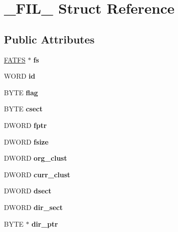 \hypertarget{struct__FIL__}{\section{\-\_\-\-F\-I\-L\-\_\- Struct Reference}
\label{struct__FIL__}
}
\subsection*{Public Attributes}
\begin{DoxyCompactItemize}
\item 
\hypertarget{struct__FIL___a2c7c5648397fc289b9cdacb36b156f9f}{\hyperlink{struct__FATFS__}{F\-A\-T\-F\-S} $\ast$ {\bfseries fs}}\label{struct__FIL___a2c7c5648397fc289b9cdacb36b156f9f}

\item 
\hypertarget{struct__FIL___a850fcae5284a3704d9412518de0d422d}{W\-O\-R\-D {\bfseries id}}\label{struct__FIL___a850fcae5284a3704d9412518de0d422d}

\item 
\hypertarget{struct__FIL___aff2b6932f44f2f8abfa83827c96d2c76}{B\-Y\-T\-E {\bfseries flag}}\label{struct__FIL___aff2b6932f44f2f8abfa83827c96d2c76}

\item 
\hypertarget{struct__FIL___aa3dc77ea6a89449c8321a3dffa33a25a}{B\-Y\-T\-E {\bfseries csect}}\label{struct__FIL___aa3dc77ea6a89449c8321a3dffa33a25a}

\item 
\hypertarget{struct__FIL___aeeeee5666f8ad032573cb4ab59712f02}{D\-W\-O\-R\-D {\bfseries fptr}}\label{struct__FIL___aeeeee5666f8ad032573cb4ab59712f02}

\item 
\hypertarget{struct__FIL___a90589d2469323345824c9d1d41eb8329}{D\-W\-O\-R\-D {\bfseries fsize}}\label{struct__FIL___a90589d2469323345824c9d1d41eb8329}

\item 
\hypertarget{struct__FIL___adf6ceb8f832d8394591440220e6a3562}{D\-W\-O\-R\-D {\bfseries org\-\_\-clust}}\label{struct__FIL___adf6ceb8f832d8394591440220e6a3562}

\item 
\hypertarget{struct__FIL___a1685f09885c2e0d6693a4133cc572e44}{D\-W\-O\-R\-D {\bfseries curr\-\_\-clust}}\label{struct__FIL___a1685f09885c2e0d6693a4133cc572e44}

\item 
\hypertarget{struct__FIL___af9d8583e9b428790f25a72e828cdb291}{D\-W\-O\-R\-D {\bfseries dsect}}\label{struct__FIL___af9d8583e9b428790f25a72e828cdb291}

\item 
\hypertarget{struct__FIL___a2fa1c03c52ce12ff16140e36b4dd3cfb}{D\-W\-O\-R\-D {\bfseries dir\-\_\-sect}}\label{struct__FIL___a2fa1c03c52ce12ff16140e36b4dd3cfb}

\item 
\hypertarget{struct__FIL___a7a746aa35c206bc7fe0d11cb5d236d0e}{B\-Y\-T\-E $\ast$ {\bfseries dir\-\_\-ptr}}\label{struct__FIL___a7a746aa35c206bc7fe0d11cb5d236d0e}

\end{DoxyCompactItemize}


